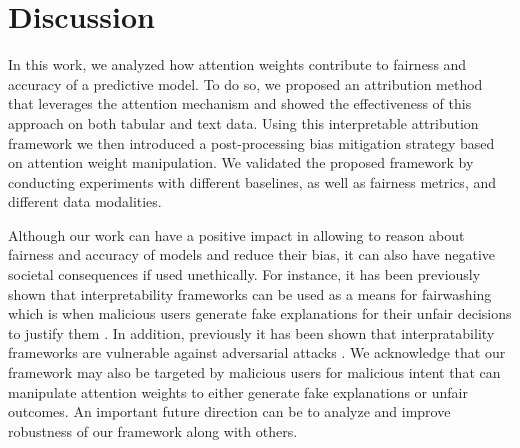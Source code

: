 \section{Discussion}
In this work, we analyzed how attention weights contribute to fairness and accuracy of a predictive model. To do so, we proposed an attribution method that leverages the  attention mechanism and showed the effectiveness of this approach on both tabular and text data. Using this interpretable attribution framework we then introduced a post-processing bias mitigation strategy based on attention weight manipulation. We validated the proposed framework by conducting experiments with different baselines, as well as fairness metrics, and different data modalities.

Although our work can have a positive impact in allowing to reason about fairness and accuracy of models and  reduce their bias, it can also have negative societal consequences if used unethically. For instance, it has been previously shown that interpretability frameworks can be used as a means for fairwashing which is when malicious users generate fake explanations for their unfair decisions to justify them \cite{pmlr-v119-anders20a}. In addition, previously it has been shown that interpratability frameworks are vulnerable against adversarial attacks \cite{slack2020fooling}. We acknowledge that our framework may also be targeted by malicious users for malicious intent that can manipulate attention weights to either generate fake explanations or unfair outcomes. An important future direction can be to analyze and improve robustness of our framework along with others. 


